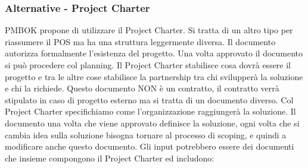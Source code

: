 \subsubsection{Alternative - Project Charter}
PMBOK propone di utilizzare il Project Charter. Si tratta di un altro tipo per riassumere il POS ma ha una struttura leggermente diversa. Il documento autorizza formalmente l'esistenza del progetto. Una volta approvato il documento si può procedere col planning.
Il Project Charter stabilisce cosa dovrà essere il progetto e tra le altre cose stabilisce la partnership tra chi svilupperà la soluzione e chi la richiede.
Questo documento NON è un contratto, il contratto verrà stipulato in caso di progetto esterno ma si tratta di un documento diverso. Col Project Charter specifichiamo come l'organizzazione raggiungerà la soluzione. Il documento una volta che viene approvato definisce la soluzione, ogni volta che si cambia idea sulla soluzione bisogna tornare al processo di scoping, e quindi a modificare anche questo documento.
Gli input potrebbero essere dei documenti che insieme compongono il Project Charter ed includono:
